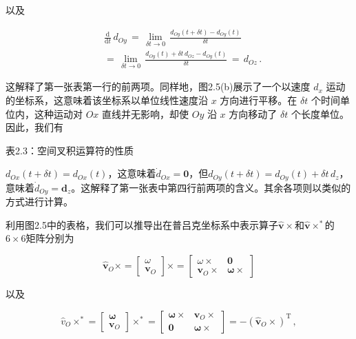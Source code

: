 \documentclass[10pt,a4paper]{book}
\theoremstyle{thmstyle} %
\theoremstyle{defstyle} %
\theoremstyle{prostyle} %
\begin{document}
以及



$$
\begin{array}{rl} & { \frac { \mathrm { d } } { \mathrm { d } t } \, d _ { O y } \, = \, \operatorname* { l i m } _ { \delta t \to 0 } \, \frac { d _ { O y } ( t + \delta t ) - d _ { O y } ( t ) } { \delta t } } \\& { = \, \operatorname* { l i m } _ { \delta t \to 0 } \, \frac { d _ { O y } ( t ) + \delta t \, d _ { O z } - d _ { O y } ( t ) } { \delta t } \, = \, d _ { O z } \, . } \end{array}
$$



这解释了第一张表第一行的前两项。同样地，图2.5(b)展示了一个以速度 $d_x$ 运动的坐标系，这意味着该坐标系以单位线性速度沿 $x$ 方向进行平移。在 $\delta t$ 个时间单位内，这种运动对 $Ox$ 直线并无影响，却使 $Oy$ 沿 $x$ 方向移动了 $\delta t$ 个长度单位。因此，我们有



表2.3：空间叉积运算符的性质





$d_{Ox}(t+\delta t)=d_{Ox}(t)$，这意味着$\dot{d}_{Ox}=\mathbf{0}$，但$d_{Oy}(t+\delta t)=d_{Oy}(t)+\delta t\,d_{z}$，意味着$\dot{d}_{Oy}=\mathbf{d}_{z}$。这解释了第一张表中第四行前两项的含义。其余各项则以类似的方式进行计算。



利用图2.5中的表格，我们可以推导出在普吕克坐标系中表示算子$\hat{\boldsymbol{v}} \times$和$\hat{\boldsymbol{v}} \times^{*}$的$6 \times 6$矩阵分别为



$$
\hat { \mathbf { v } } _ { O } \times = \left[ \begin{array}{l} { \omega } \\{ \mathbf { v } _ { O } } \end{array} \right] \times = \left[ \begin{array}{ll} { \omega \times } & { \mathbf { 0 } } \\{ \mathbf { v } _ { O } \times } & { \mathbf { \omega } \times } \end{array} \right]
$$  



以及



$$
\hat { v } _ { O } \times ^{*} = \left[ \begin{array}{l} { \boldsymbol { \omega } } \\{ \boldsymbol { v } _ { O } } \end{array} \right] \times ^{*} = \left[ \begin{array}{ll} { \boldsymbol { \omega } \times } & { \boldsymbol { v } _ { O } \times } \\{ \boldsymbol { 0 } } & { \boldsymbol { \omega } \times } \end{array} \right] = - ( \boldsymbol { \hat { v } } _ { O } \times ) ^{\mathrm { T} } \, ,
$$  
\end{document}

